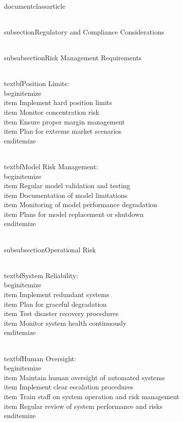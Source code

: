 \\documentclass{article}
\begin{document}
\\subsection{Regulatory and Compliance Considerations}

\\subsubsection{Risk Management Requirements}

\\textbf{Position Limits}:
\\begin{itemize}
\\item Implement hard position limits
\\item Monitor concentration risk
\\item Ensure proper margin management
\\item Plan for extreme market scenarios
\\end{itemize}

\\textbf{Model Risk Management}:
\\begin{itemize}
\\item Regular model validation and testing
\\item Documentation of model limitations
\\item Monitoring of model performance degradation
\\item Plans for model replacement or shutdown
\\end{itemize}

\\subsubsection{Operational Risk}

\\textbf{System Reliability}:
\\begin{itemize}
\\item Implement redundant systems
\\item Plan for graceful degradation
\\item Test disaster recovery procedures
\\item Monitor system health continuously
\\end{itemize}

\\textbf{Human Oversight}:
\\begin{itemize}
\\item Maintain human oversight of automated systems
\\item Implement clear escalation procedures
\\item Train staff on system operation and risk management
\\item Regular review of system performance and risks
\\end{itemize}
\end{document}
